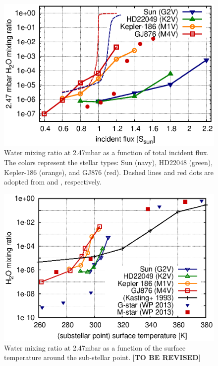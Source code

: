 \documentclass[11pt,numberedappendix,twocolappendix,]{emulateapj}
\def\preslevel{2.47}
\def\memo#1{\color{red}$[${\bf #1}$]$ \color{black}}
\begin{document}
\begin{figure}[!h]
    \begin{center}
    \includegraphics[width=\hsize]{fig/AqOH0TLS_xH2O_3mbar_all.eps}
    \end{center}
\caption{Water mixing ratio at \preslevel mbar as a function of total incident flux. The colors represent the stellar types: Sun (navy), HD22048 (green), Kepler-186 (orange), and GJ876 (red). Dashed lines and red dots are adopted from \citet{Kasting1993} and \citet{Wordsworth2013}, respectively.}                                                                                                             
\label{fig:xH2O_S0X}
\end{figure}

\begin{figure}[!h]
    \begin{center}
    \includegraphics[width=\hsize]{fig/AqOH0TLS_tsurf_xH2O_GCM_Kasting_WP.eps}
    \end{center}
\caption{Water mixing ratio at \preslevel mbar as a function of the surface temperature around the sub-stellar point. \memo{TO BE REVISED}}                                                                                                             
\label{fig:AqOH0TLS_tsurf_xH2O_GCM_Kasting_WP}
\end{figure}
\end{document}
